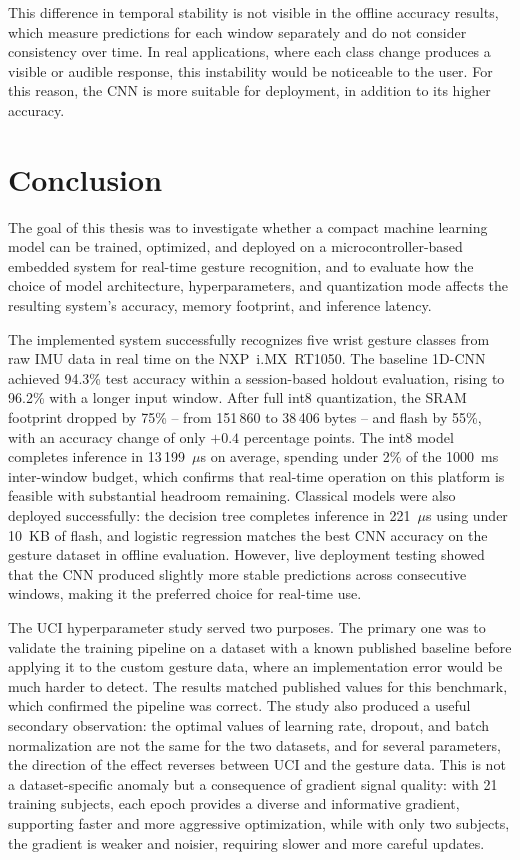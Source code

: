 This difference in temporal stability is not visible in the offline accuracy results, which measure predictions for each window separately and do not consider consistency over time. In real applications, where each class change produces a visible or audible response, this instability would be noticeable to the user. For this reason, the CNN is more suitable for deployment, in addition to its higher accuracy.

\chapter{Conclusion}
\label{chap:conclusion}
The goal of this thesis was to investigate whether a compact machine learning model can be trained, optimized, and deployed on a microcontroller-based embedded system for real-time gesture recognition, and to evaluate how the choice of model architecture, hyperparameters, and quantization mode affects the resulting system's accuracy, memory footprint, and
inference latency. 
 
The implemented system successfully recognizes five wrist gesture classes from raw IMU data in real time on the NXP~i.MX~RT1050. The baseline 1D-CNN achieved 94.3\% test accuracy within a session-based holdout evaluation, rising to 96.2\% with a longer input window. After full int8 quantization, the SRAM footprint dropped by 75\% -- from 151\,860 to 38\,406 bytes -- and flash by 55\%, with an accuracy change of only $+0.4$ percentage points. The int8 model completes inference in 13\,199~$\mu$s on average, spending under 2\% of the 1000~ms inter-window budget, which confirms that real-time operation on this platform is feasible with substantial headroom remaining. Classical models were also deployed successfully: the decision tree completes inference in 221~$\mu$s using under 10~KB of flash, and logistic regression matches the best CNN accuracy on the gesture dataset in offline evaluation. However, live deployment testing showed that the CNN produced slightly more stable predictions across consecutive windows, making it the preferred choice for real-time use.

The UCI hyperparameter study served two purposes. The primary one was to validate the training pipeline on a dataset with a known published baseline before applying it to the custom gesture data, where an implementation error would be much harder to detect. The results matched published values for this benchmark, which confirmed the pipeline was correct. The study also produced a useful secondary observation: the optimal values of learning rate, dropout, and batch normalization are not the same for the two datasets, and for several parameters, the direction of the effect reverses between UCI and the gesture data. This is not a dataset-specific anomaly but a consequence of gradient signal quality: with 21 training subjects, each epoch provides a diverse and informative gradient, supporting faster and more aggressive optimization, while with only two subjects, the gradient is weaker and noisier, requiring slower and more careful updates. 
 
